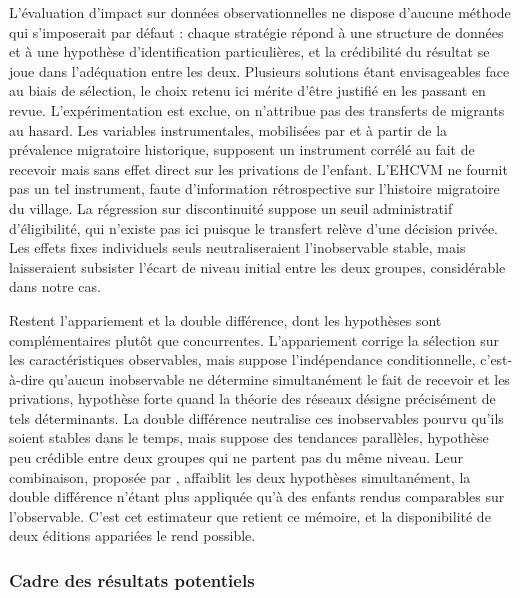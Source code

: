 L'évaluation d'impact sur données observationnelles ne dispose d'aucune
méthode qui s'imposerait par défaut : chaque stratégie répond à une
structure de données et à une hypothèse d'identification particulières, et
la crédibilité du résultat se joue dans l'adéquation entre les deux.
Plusieurs solutions étant envisageables face au biais de sélection, le
choix retenu ici mérite d'être justifié en les passant en revue.
L'expérimentation est exclue, on n'attribue pas des transferts de
migrants au hasard. Les variables instrumentales, mobilisées par
\textcite{calero2009} et \textcite{davis2016} à partir de la prévalence
migratoire historique, supposent un instrument corrélé au fait de recevoir mais
sans effet direct sur les privations de l'enfant. L'EHCVM ne fournit pas un tel
instrument, faute d'information rétrospective sur l'histoire migratoire du
village. La régression sur discontinuité suppose un seuil administratif
d'éligibilité, qui n'existe pas ici puisque le transfert relève d'une décision
privée. Les effets fixes individuels seuls neutraliseraient
l'inobservable stable, mais laisseraient subsister l'écart de niveau initial
entre les deux groupes, considérable dans notre cas.

Restent l'appariement et la double différence, dont les hypothèses sont
complémentaires plutôt que concurrentes. L'appariement corrige la sélection sur
les caractéristiques observables, mais suppose l'indépendance conditionnelle,
c'est-à-dire qu'aucun inobservable ne détermine simultanément le fait de
recevoir et les privations, hypothèse forte quand la théorie des réseaux
désigne précisément de tels déterminants. La double différence neutralise ces
inobservables pourvu qu'ils soient stables dans le temps, mais suppose des
tendances parallèles, hypothèse peu crédible entre deux groupes qui ne partent
pas du même niveau. Leur combinaison, proposée par \textcite{heckman1997,
heckman1998}, affaiblit les deux hypothèses simultanément, la double différence
n'étant plus appliquée qu'à des enfants rendus comparables sur l'observable.
C'est cet estimateur que retient ce mémoire, et la disponibilité de deux éditions
appariées le rend possible.

\subsubsection{Cadre des résultats potentiels}

